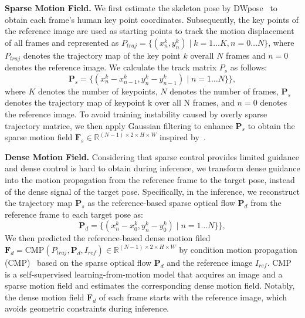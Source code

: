 \textbf{Sparse Motion Field.}
We first estimate the skeleton pose by DWpose~\citep{yang2023dwpose} to obtain each frame's human key point coordinates. 
Subsequently, the key points of the reference image are used as starting points to track the motion displacement of all frames and represented as $P_{traj}\!=\!\{(x^k_n,y^k_n) \!\mid\! k=1\dots K, n=0\dots N\}$, where $P_{traj}$ denotes the trajectory map of the key point $k$ overall $N$ frames and $n = 0$ denotes the reference image. We calculate the track matrix $P_{s}$ as follows:
\begin{equation}
    \mathbf{P}_{s}=\{(x^k_n-x^k_{n-1}, y^k_n-y^k_{n-1}) \mid n=1\dots N\}\},
\end{equation}
where $K$ denotes the number of keypoints, $N$ denotes the number of frames, $\mathbf{P}_{s}$ denotes the trajectory map of keypoint k over all N frames, and $n = 0$ denotes the reference image.
To avoid training instability caused by overly sparse trajectory matrice, we then apply Gaussian filtering to enhance $\mathbf{P}_{s}$ to obtain the sparse motion field $\mathbf{F}_s\!\in\!\mathbb{R}^{(N-1)\times 2 \times H \times W}$ inspired by~\citep{yin2023dragnuwa, wang2024motionctrl}.

\textbf{Dense Motion Field.}
Considering that sparse control provides limited guidance and dense control is hard to obtain during inference,
we transform dense guidance into the motion propagation from the reference frame to the target pose, instead of the dense signal of the target pose. Specifically, in the inference, we reconstruct the trajectory map $\mathbf{P}_{s}$ as the reference-based sparse optical flow $\mathbf{P}_{d}$ from the reference frame to each target pose as:
\begin{equation}
    \mathbf{P}_{d}=\{(x^k_n-x^k_{0}, y^k_n-y^k_{0}) \mid n=1\dots N\}\},
\end{equation}
We then predicted the reference-based dense motion filed $\mathbf{F}_d\!=\! \text{CMP}(P_{traj}, \mathbf{P}_{d}, I_{ref})\!\in\!\mathbb{R}^{(N-1)\times 2 \times H \times W}$ by condition motion propagation (CMP)~\citep{zhan2019self} based on the sparse optical flow $\mathbf{P}_{d}$ and the reference image $I_{ref}$.
CMP~\citep{zhan2019self} is a self-supervised learning-from-motion model that acquires an image and a sparse motion field and estimates the corresponding dense motion field.
Notably, the dense motion field $\mathbf{F}_d$ of each frame starts with the reference image, which avoids geometric constraints during inference.

